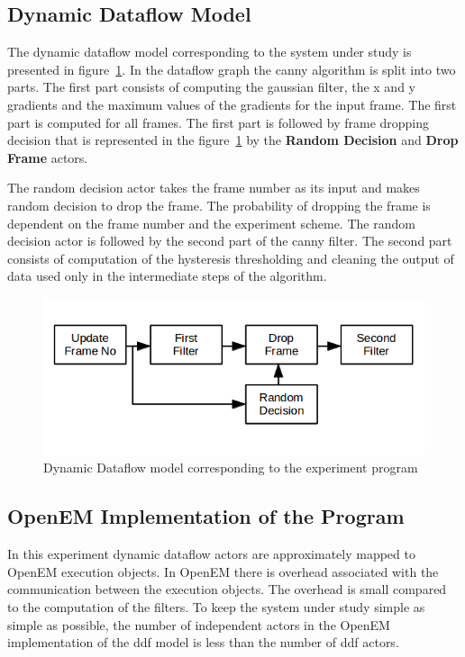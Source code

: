 \documentclass[a4paper,10pt]{article}
\begin{document}
\subsection{Dynamic Dataflow Model}
The dynamic dataflow model corresponding to the system under study is presented in figure~\ref{fig:ddf_model}. In the dataflow graph the canny algorithm is split into two parts. The first part consists of computing the gaussian filter, the x and y gradients and the maximum values of the gradients for the input frame. The first part is computed for all frames. The first part is followed by frame dropping decision that is represented in the figure~\ref{fig:ddf_model} by the \textbf{Random Decision} and \textbf{Drop Frame} actors.

The random decision actor takes the frame number as its input and makes random decision to drop the frame. The probability of dropping the frame is dependent on the frame number and the experiment scheme. The random decision actor is followed by the second part of the canny filter. The second part consists of computation of the hysteresis thresholding and cleaning the output of data used only in the intermediate steps of the algorithm.

\begin{figure}[!h]
    \centering
        \includegraphics[width=30pc]{ddf_model.png}
        \caption{Dynamic Dataflow model corresponding to the experiment program}
        \label{fig:ddf_model}
\end{figure}

\subsection{OpenEM Implementation of the Program}
In this experiment dynamic dataflow actors are approximately mapped to OpenEM execution objects. In OpenEM there is overhead associated with the communication between the execution objects. The overhead is small compared to the computation of the filters. To keep the system under study simple as simple as possible, the number of independent actors in the OpenEM implementation of the ddf model is less than the number of ddf actors.
\end{document}
